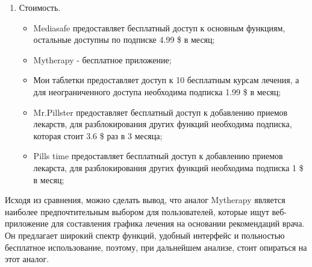\begin{enumerate}
        \item Стоимость.
        \begin{itemize}
            \item Mediasafe предоставляет бесплатный доступ к основным функциям, остальные доступны по подписке 4.99 \$ в месяц;
            \item Mytherapy - бесплатное приложение;
            \item Мои таблетки предоставляет доступ к 10 бесплатным курсам лечения, а для неограниченного доступа необходима подписка 1.99 \$ в месяц;
            \item Mr.Pillster предоставляет бесплатный доступ к добавлению приемов лекарств, для разблокирования других функций необходима подписка, которая стоит 3.6 \$ раз в 3 месяца;
            \item Pills time предоставляет бесплатный доступ к добавлению приемов лекарста, для разблокирования других функций необходима подписка 1 \$ в месяц;
        \end{itemize}
            
    \end{enumerate}
    
    
    Исходя из сравнения, можно сделать вывод, что аналог Mytherapy является наиболее предпочтительным выбором для пользователей, которые ищут веб-приложение для составления графика лечения на основании рекомендаций врача. Он предлагает широкий спектр функций, удобный интерфейс и польностью бесплатное использование, поэтому, при дальнейшем анализе, стоит опираться на этот аналог.
    
